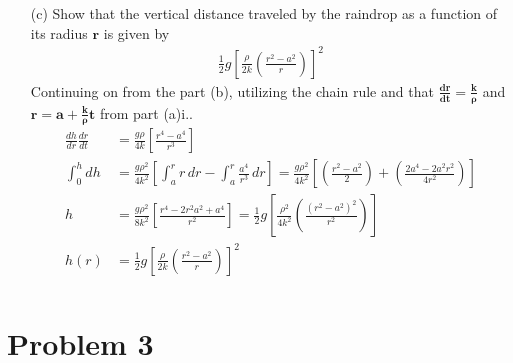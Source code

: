 \documentclass[]{article}
\begin{document}
{\begin{enumerate}
\begin{enumerate}
					\item[iii.] Explain why this model is physically meaningful only if $\bm{0 \leq t \le -\frac{a\rho}{k}}$
						\paragraph{} Examining $r = a + \frac{k}{\rho} t$. If $t < 0$, the raindrop would increase in radius from its initial radius $a$ because of the negative constant, which is physically impossible in our case. If $t > \frac{-a\rho}{k}$, this would give a negative radius, which is also physically impossible. \\
				\end{enumerate}
	\clearpage
			\item[(c)] Show that the vertical distance traveled by the raindrop as a function of its radius $\bm{r}$ is given by
			\begin{equation*}
				\begin{split}
					\frac{1}{2} g \left[ \frac{\rho}{2k} \left( \frac{r^2 - a^2}{r} \right) \right]^2
				\end{split}
			\end{equation*}
			Continuing on from the part (b), utilizing the chain rule and that $\bm{\frac{dr}{dt} = \frac{k}{\rho}}$ and $\bm{r = a + \frac{k}{\rho}t}$ from part (a)i..
				\begin{equation*}
					\begin{split}
						\frac{dh}{dr} \frac{dr}{dt} &= \frac{g \rho}{4k} \left[ \frac{r^4 - a^4}{r^3} \right] \\
						\int_{0}^{h} dh &= \frac{g \rho^2}{4k^2} \left[ \int_{a}^{r} r \, dr - \int_{a}^{r} \frac{a^4}{r^3} \, dr \right]
						= \frac{g \rho^2}{4k^2} \left[ \left( \frac{r^2 - a^2}{2} \right) + \left( \frac{2a^4-2a^2 r^2}{4r^2} \right) \right] \\
						h &= \frac{g \rho^2}{8k^2} \left[ \frac{r^4 -2r^2 a^2 + a^4}{r^2}\right]
						= \frac{1}{2} g \left[ \frac{\rho^2}{4k^2} \left( \frac{(r^2 - a^2)^2}{r^2} \right) \right] \\
						h(r) &= \frac{1}{2} g \left[ \frac{\rho}{2k} \left( \frac{r^2 - a^2}{r} \right) \right]^2 \\
					\end{split}
				\end{equation*}
			
		\end{enumerate}
		
	\section*{Problem 3}
}
\end{document}
